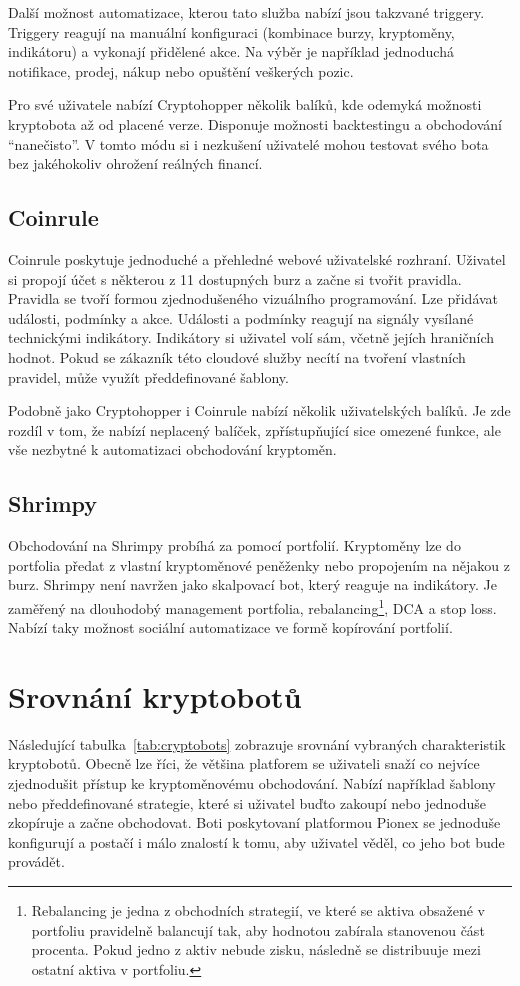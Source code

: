Další možnost automatizace, kterou tato služba nabízí jsou takzvané triggery. Triggery reagují na manuální konfiguraci (kombinace burzy, kryptoměny, indikátoru) a vykonají
přidělené akce. Na výběr je například jednoduchá notifikace, prodej, nákup nebo opuštění veškerých pozic.

Pro své uživatele nabízí Cryptohopper několik balíků, kde odemyká možnosti kryptobota až od placené verze. Disponuje možnosti backtestingu a obchodování \enquote{nanečisto}.
V tomto módu si i nezkušení uživatelé mohou testovat svého bota bez jakéhokoliv ohrožení reálných financí. \cite{cryptohopper}

\subsection{Coinrule}
Coinrule poskytuje jednoduché a přehledné webové uživatelské rozhraní. Uživatel si propojí účet s některou z 11 dostupných burz a začne si tvořit pravidla. Pravidla se tvoří
formou zjednodušeného vizuálního programování. Lze přidávat události, podmínky a akce. Události a podmínky reagují na signály vysílané technickými indikátory. Indikátory
si uživatel volí sám, včetně jejích hraničních hodnot. Pokud se zákazník této cloudové služby necítí na tvoření vlastních pravidel, může využít předdefinované šablony.

Podobně jako Cryptohopper i Coinrule nabízí několik uživatelských balíků. Je zde rozdíl v tom, že nabízí neplacený balíček, zpřístupňující sice omezené funkce, ale
vše nezbytné k automatizaci obchodování kryptoměn. \cite{coinrule}


\subsection{Shrimpy}
Obchodování na Shrimpy probíhá za pomocí portfolií. Kryptoměny lze do portfolia předat z vlastní kryptoměnové peněženky nebo propojením na nějakou z burz. Shrimpy není navržen jako
skalpovací bot, který reaguje na indikátory. Je zaměřený na dlouhodobý management portfolia, rebalancing\footnote{Rebalancing je jedna z obchodních strategií, ve které
    se aktiva obsažené v portfoliu pravidelně balancují tak, aby hodnotou zabírala stanovenou část procenta. Pokud jedno z aktiv nebude zisku, následně se distribuuje mezi ostatní
    aktiva v portfoliu.},
DCA a stop loss. Nabízí taky možnost sociální automatizace ve formě kopírování portfolií. \cite{shrimpy}


\section{Srovnání kryptobotů}
Následující tabulka~\ref{tab:cryptobots} zobrazuje srovnání vybraných charakteristik kryptobotů. Obecně lze říci, že většina platforem se uživateli snaží
co nejvíce zjednodušit přístup ke kryptoměnovému obchodování. Nabízí například šablony nebo předdefinované strategie, které si uživatel buďto zakoupí nebo jednoduše zkopíruje
a začne obchodovat. Boti poskytovaní platformou Pionex se jednoduše konfigurují a postačí i málo znalostí k tomu, aby uživatel věděl, co jeho bot bude provádět.

